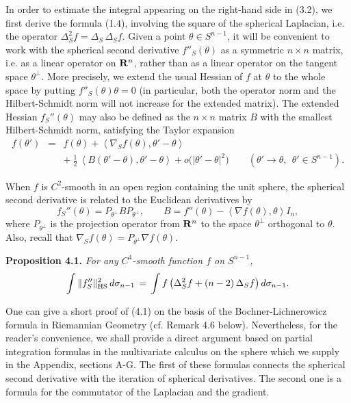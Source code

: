 \documentclass[reqno,12pt]{amsart}
\theoremstyle{plain}
\begin{document}
\vskip2mm
\noindent
In order to estimate the integral appearing on the right-hand side in (3.2), 
we first derive the formula (1.4), involving the square of the spherical 
Laplacian, i.e. the operator $\Delta_S^2 f = \Delta_S\, \Delta_S f$. Given 
a point $\theta \in S^{n-1}$, it will be convenient to work with the 
spherical second derivative $f''_S(\theta)$ as a symmetric $n \times n$ 
matrix, i.e. as a linear operator on ${{\bf R}}^n$, rather than as a linear operator 
on the tangent space $\theta^\perp$. More precisely, we extend the usual 
Hessian of $f$ at $\theta$ to the whole space by putting
$f''_S(\theta)\theta = 0$ (in particular, both the operator norm and the 
Hilbert-Schmidt norm will not increase for the extended matrix).
The extended Hessian $f_S''(\theta)$ may also be defined as the $n \times n$ 
matrix $B$ with the smallest Hilbert-Schmidt norm, satisfying the Taylor 
expansion
\begin{eqnarray*}
f(\theta') 
 & = &
f(\theta) + \left<\nabla_S f(\theta),\theta' - \theta\right> \\
 & & + \
\frac{1}{2}\, \left<B(\theta' - \theta),\theta' - \theta\right> +
o\big(|\theta' - \theta|^2\big) \qquad
(\theta' \rightarrow \theta, \ \ \theta' \in S^{n-1}).
\end{eqnarray*}

When $f$ is $C^2$-smooth in an open region containing 
the unit sphere, the spherical second derivative is related to 
the Euclidean derivatives by
$$
f_S''(\theta) = P_{\theta^\perp} B P_{\theta^\perp}, \qquad 
B = f''(\theta) - \left<\nabla f(\theta),\theta\right> I_n,
$$
where $P_{\theta^\perp}$ is the projection operator from ${{\bf R}}^n$ 
to the space $\theta^\perp$ orthogonal to $\theta$. Also, recall that 
$\nabla_S f(\theta) = P_{\theta^\perp} \nabla f(\theta)$.

\vskip5mm
{\bf Proposition 4.1.} {\it For any $C^4$-smooth function $f$ on $S^{n-1}$,
\begin{equation}
\int \|f_S''\|_{\rm HS}^2\,d\sigma_{n-1} \, = \,
\int f\, \big(\Delta^2_S f + (n-2)\, \Delta_S f\big)\, d\sigma_{n-1}.
\end{equation}
}

\vskip2mm
One can give a short proof of (4.1) on the basis of the 
Bochner-Lichnerowicz formula in Riemannian Geometry (cf. Remark 4.6
below). Nevertheless, for the reader's convenience, we shall provide a direct
argument based on partial integration formulas in the multivariate
calculus on the sphere which we 
supply in the Appendix, sections A-G. 
The first of these formulas connects the spherical second derivative with 
the iteration of spherical derivatives. The second one is a formula for the 
commutator of the Laplacian and the gradient.
\end{document}
